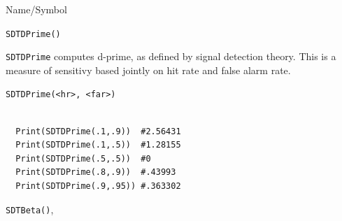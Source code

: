 \begin{desc}{Name/Symbol}
\item[Name/Symbol] 	\verb+SDTDPrime()+

\item[Description] \verb+SDTDPrime+ computes d-prime, as defined by
signal detection theory.  This is a measure of sensitivy based jointly
on hit rate and false alarm rate.

\item[Usage]        	
\begin{verbatim}
SDTDPrime(<hr>, <far>)
\end{verbatim}

\item[Example] 	
\begin{verbatim}

  Print(SDTDPrime(.1,.9))  #2.56431
  Print(SDTDPrime(.1,.5))  #1.28155
  Print(SDTDPrime(.5,.5))  #0
  Print(SDTDPrime(.8,.9))  #.43993
  Print(SDTDPrime(.9,.95)) #.363302

\end{verbatim}

\item[See Also]\verb+SDTBeta()+,
\end{desc}



